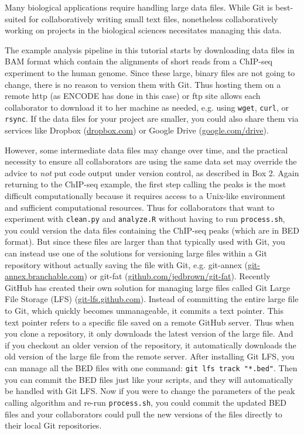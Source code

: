 \documentclass[10pt]{article}
\begin{document}
Many biological applications require handling large data files.
While Git is best-suited for collaboratively writing small text files, nonetheless collaboratively working on projects in the biological sciences necesitates managing this data.

The example analysis pipeline in this tutorial starts by downloading data files in BAM format which contain the alignments of short reads from a ChIP-seq experiment to the human genome.
Since these large, binary files are not going to change, there is no reason to version them with Git.
Thus hosting them on a remote http (as ENCODE has done in this case) or ftp site allows each collaborator to download it to her machine as needed, e.g. using \verb|wget|, \verb|curl|, or \verb|rsync|.
If the data files for your project are smaller, you could also share them via services like Dropbox (\href{www.dropbox.com}{dropbox.com}) or Google Drive (\href{https://www.google.com/drive/}{google.com/drive}).

However, some intermediate data files may change over time, and the practical necessity to ensure all collaborators are using the same data set may override the advice to \textit{not} put code output under version control, as described in Box 2.
Again returning to the ChIP-seq example, the first step calling the peaks is the most difficult computationally because it requires access to a Unix-like environment and sufficient computational resources.
Thus for collaborators that want to experiment with \verb|clean.py| and \verb|analyze.R| without having to run \verb|process.sh|, you could version the data files containing the ChIP-seq peaks (which are in BED format).
But since these files are larger than that typically used with Git, you can instead use one of the solutions for versioning large files within a Git repository without actually saving the file with Git, e.g. git-annex (\href{https://git-annex.branchable.com/}{git-annex.branchable.com}) or git-fat (\href{https://github.com/jedbrown/git-fat/}{github.com/jedbrown/git-fat}).
Recently GitHub has created their own solution for managing large files called Git Large File Storage (LFS) (\href{https://git-lfs.github.com/}{git-lfs.github.com}).
Instead of committing the entire large file to Git, which quickly becomes unmanageable, it commits a text pointer.
This text pointer refers to a specific file saved on a remote GitHub server.
Thus when you clone a repository, it only downloads the latest version of the large file.
And if you checkout an older version of the repository, it automatically downloads the old version of the large file from the remote server.
After installing Git LFS, you can manage all the BED files with one command: \verb|git lfs track "*.bed"|.
Then you can commit the BED files just like your scripts, and they will automatically be handled with Git LFS.
Now if you were to change the parameters of the peak calling algorithm and re-run \verb|process.sh|, you could commit the updated BED files and your collaborators could pull the new versions of the files directly to their local Git repositories.
\end{document}
